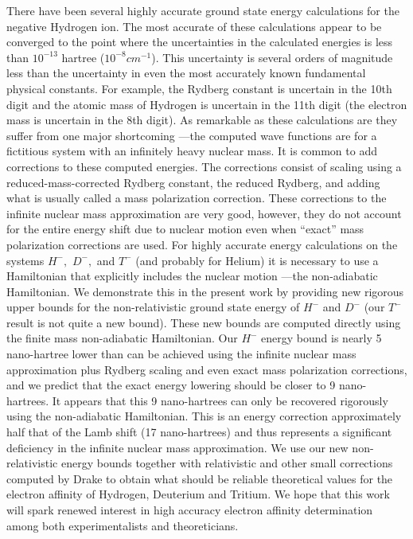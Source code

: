 \documentclass[12pt,thmsa]{article}
\begin{document}
There have been several highly accurate ground state energy calculations for
the negative Hydrogen ion\cite
{Pekeris62,Frankowski66,Drake88,Baker90,Thakkar94,Ackermann95}. The most
accurate of these calculations\cite{Drake88,Baker90,Thakkar94} appear to be
converged to the point where the uncertainties in the calculated energies is
less than $10^{-13}$ hartree ($10^{-8}cm^{-1}$). This uncertainty is several
orders of magnitude less than the uncertainty in even the most accurately
known fundamental physical constants. For example, the Rydberg constant is
uncertain in the 10th digit\cite{Petley92} and the atomic mass of Hydrogen
is uncertain in the 11th digit\cite{Audi93} (the electron mass is uncertain
in the 8th digit\cite{Audi93}). As remarkable as these calculations are they
suffer from one major shortcoming ---the computed wave functions are for a
fictitious system with an infinitely heavy nuclear mass. It is common to add
corrections to these computed energies. The corrections consist of scaling
using a reduced-mass-corrected Rydberg constant, the reduced Rydberg, and
adding what is usually called a mass polarization correction\cite
{BetheSalpeter}. These corrections to the infinite nuclear mass
approximation are very good, however, they do not account for the entire
energy shift due to nuclear motion even when ``exact'' mass polarization
corrections are used. For highly accurate energy calculations on the systems 
$H^{-},\,\,D^{-},\,\,$and $T^{-}$ (and probably for Helium) it is necessary
to use a Hamiltonian that explicitly includes the nuclear motion ---the
non-adiabatic Hamiltonian. We demonstrate this in the present work by
providing new rigorous upper bounds for the non-relativistic ground state
energy of $H^{-}$ and $D^{-}$ (our $T^{-}$ result is not quite a new bound).
These new bounds are computed directly using the finite mass non-adiabatic
Hamiltonian. Our $H^{-}$ energy bound is nearly 5 nano-hartree lower than
can be achieved using the infinite nuclear mass approximation plus Rydberg
scaling and even exact mass polarization corrections, and we predict that
the exact energy lowering should be closer to 9 nano-hartrees. It appears
that this 9 nano-hartrees can only be recovered rigorously using the
non-adiabatic Hamiltonian. This is an energy correction approximately half
that of the Lamb shift (17 nano-hartrees\cite{Drake88}) and thus represents
a significant deficiency in the infinite nuclear mass approximation. We use
our new non-relativistic energy bounds together with relativistic and other
small corrections computed by Drake\cite{Drake88} to obtain what should be
reliable theoretical values for the electron affinity of Hydrogen, Deuterium
and Tritium. We hope that this work will spark renewed interest in high
accuracy electron affinity determination among both experimentalists and
theoreticians.
\end{document}
